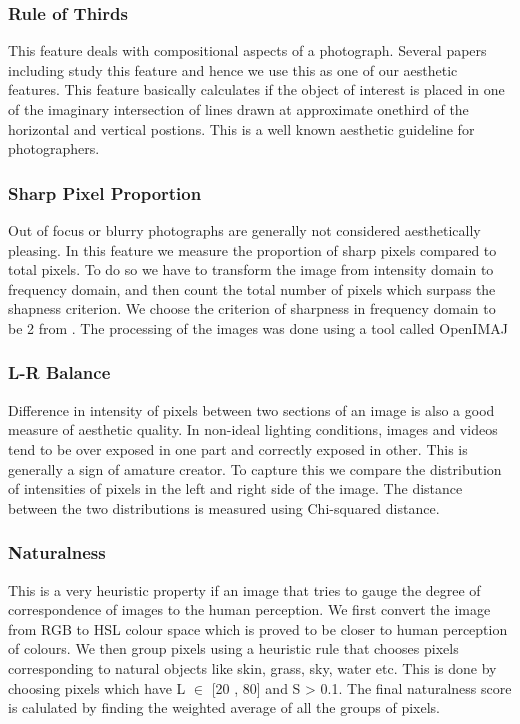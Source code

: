 \subsubsection{Rule of Thirds}
This feature deals with compositional aspects of a photograph. Several papers including \cite{yeh2010personalized} study this feature and hence we use this as one of our aesthetic features. This feature basically calculates if the object of interest is placed in one of the imaginary intersection of lines drawn at approximate onethird of the horizontal and vertical postions. This is a well known aesthetic guideline for photographers.

\subsubsection{Sharp Pixel Proportion}
Out of focus or blurry photographs are generally not considered aesthetically pleasing. In this feature we measure the proportion of sharp pixels compared to total pixels. To do so we have to transform the image from intensity domain to frequency domain, and then count the total number of pixels which surpass the shapness criterion. We choose the criterion of sharpness in frequency domain to be 2 from \cite{yeh2010personalized}. The processing of the images was done using a tool called OpenIMAJ \cite{Hare:2011:OIJ:2072298.2072421}

\subsubsection{L-R Balance}
Difference in intensity of pixels between two sections of an image is also a good measure of aesthetic quality. In non-ideal lighting conditions, images and videos tend to be over exposed in one part and correctly exposed in other. This is generally a sign of amature creator. To capture this we compare the distribution of intensities of pixels in the left and right side of the image. The distance between the two distributions is measured using Chi-squared distance.

\subsubsection{Naturalness}
This is a very heuristic property if an image that tries to gauge the degree of correspondence of images to the human perception. We first convert the image from RGB to HSL colour space which is proved to be closer to human perception of colours. We then group pixels using a heuristic rule that chooses pixels corresponding to natural objects like skin, grass, sky, water etc. This is done by choosing pixels which have L \begin{math} \in \end{math} [20 , 80] and S > 0.1. The final naturalness score is calulated by finding the weighted average of all the groups of pixels. \cite{predictingPintrest}

